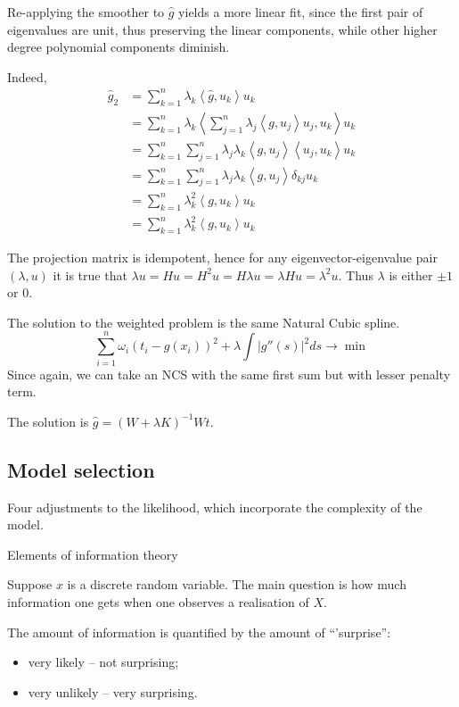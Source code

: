 \documentclass[a4paper]{article}
\newcommand{\brac}[1]{{\left ( #1 \right )}}
\newcommand{\abs}[1]{{\left | #1 \right |}}
\newcommand{\brkt}[1]{{\left\langle #1 \right\rangle}}
\begin{document}
Re-applying the smoother to $\hat{g}$ yields a more linear fit, since the first pair of eigenvalues are unit, thus preserving the linear components, while other higher degree polynomial components diminish.

Indeed, \begin{align*}
	\hat{g}_2 & = \sum_{k=1}^n \lambda_k \brkt{\hat{g}, u_k} u_k \\
	& = \sum_{k=1}^n \lambda_k \brkt{\sum_{j=1}^n \lambda_j \brkt{g, u_j} u_j, u_k} u_k \\
	& = \sum_{k=1}^n \sum_{j=1}^n \lambda_j \lambda_k \brkt{g, u_j} \brkt{u_j, u_k} u_k \\
	& = \sum_{k=1}^n \sum_{j=1}^n \lambda_j \lambda_k \brkt{g, u_j} \delta_{kj} u_k \\
	& = \sum_{k=1}^n \lambda_k^2 \brkt{g, u_k} u_k \\
	& = \sum_{k=1}^n \lambda_k^2 \brkt{g, u_k} u_k
\end{align*}

The projection matrix is idempotent, hence for any eigenvector-eigenvalue pair $(\lambda, u)$ it is true that $\lambda u = Hu = H^2u = H\lambda u = \lambda Hu = \lambda^2 u$. Thus $\lambda$ is either $\pm1$ or $0$.

The solution to the weighted problem is the same Natural Cubic spline.
\[\sum_{i=1}^n \omega_i \brac{t_i - g(x_i)}^2 + \lambda \int \abs{g''(s)}^2 ds \to \min\]
Since again, we can take an NCS with the same first sum but with lesser penalty term.

The solution is $\hat{g} = \brac{W+\lambda K}^{-1} Wt$.

\subsection{Model selection} %
\label{sub:model_selection}


Four adjustments to the likelihood, which incorporate the complexity of the model.

Elements of information theory

Suppose $x$ is a discrete random variable.
The main question is how much information one gets when one observes a realisation of $X$.

The amount of information is quantified by the amount of ``'surprise'':\begin{itemize}
	\item very likely -- not surprising;
	\item very unlikely -- very surprising.
\end{itemize}
\end{document}

